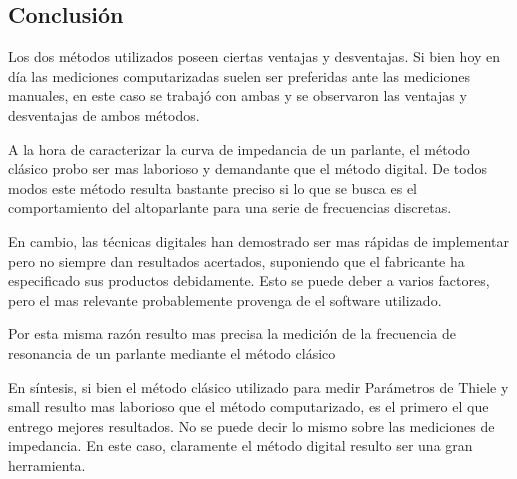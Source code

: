 \documentclass[]{article}
\begin{document}
\begin{multicols}{2}
\section{Conclusión}
Los dos métodos utilizados poseen ciertas ventajas y desventajas. Si bien hoy en día
las mediciones computarizadas suelen ser preferidas ante las mediciones manuales,
en este caso se trabajó con ambas y se observaron las ventajas y desventajas de
ambos métodos.

A la hora de caracterizar la curva de impedancia de un parlante, el método
clásico probo ser mas laborioso y demandante que el método digital. De todos modos
este método resulta bastante preciso si lo que se busca es el comportamiento del
altoparlante para una serie de frecuencias discretas.

En cambio, las técnicas digitales han demostrado ser mas rápidas de implementar
pero no siempre dan resultados acertados, suponiendo que el fabricante ha especificado
sus productos debidamente. Esto se puede deber a varios factores, pero el mas
relevante probablemente provenga de el software utilizado.

Por esta misma razón resulto mas precisa la medición de la frecuencia de resonancia
de un parlante mediante el método clásico

En síntesis, si bien el método clásico utilizado para medir Parámetros de Thiele y small
resulto mas laborioso que el método computarizado, es el primero el que entrego
mejores resultados. No se puede decir lo mismo sobre las mediciones de impedancia.
En este caso, claramente el método digital resulto ser una gran herramienta.
\printbibliography

\end{multicols}
\end{document}
